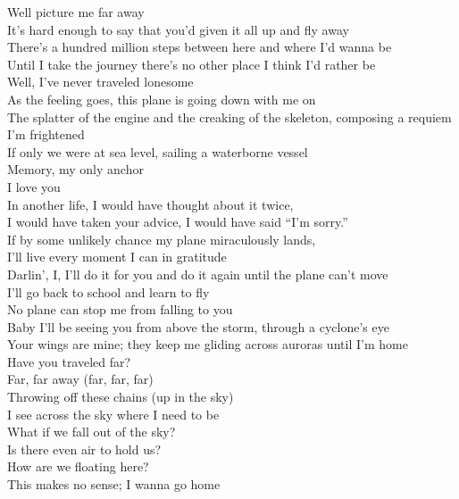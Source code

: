 Well picture me far away \\
It's hard enough to say that you'd given it all up and fly away \\
There's a hundred million steps between here and where I'd wanna be \\
Until I take the journey there's no other place I think I'd rather be \\

Well, I've never traveled lonesome \\
As the feeling goes, this plane is going down with me on \\

The splatter of the engine and the creaking of the skeleton, composing a requiem \\
I'm frightened \\
If only we were at sea level, sailing a waterborne vessel \\
Memory, my only anchor \\
I love you \\
In another life, I would have thought about it twice, \\
I would have taken your advice, I would have said ``I'm sorry.'' \\
If by some unlikely chance my plane miraculously lands, \\
I'll live every moment I can in gratitude \\

Darlin', I, I'll do it for you and do it again until the plane can't move \\
I'll go back to school and learn to fly \\
No plane can stop me from falling to you \\
Baby I'll be seeing you from above the storm, through a cyclone's eye \\
Your wings are mine; they keep me gliding across auroras until I'm home \\

Have you traveled far? \\
Far, far away (far, far, far) \\
Throwing off these chains (up in the sky) \\
I see across the sky where I need to be \\

What if we fall out of the sky? \\
Is there even air to hold us? \\
How are we floating here? \\
This makes no sense; I wanna go home \\

